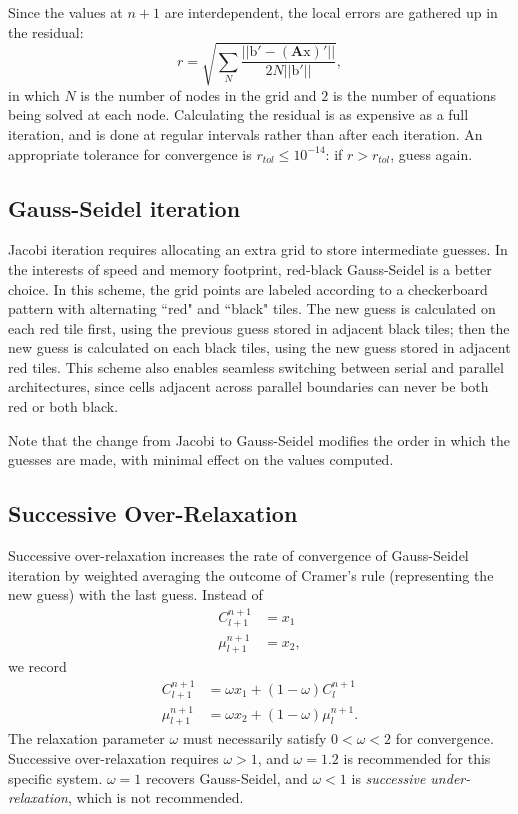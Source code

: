 	Since the values at $n+1$ are interdependent, the local errors are gathered up in the residual:
	\[r = \sqrt{\sum\limits_{N}\frac{||\mathrm{b}' - \left(\mathbf{A}\mathrm{x}\right)'||}{2N||\mathrm{b}'||}},\]
	in which $N$ is the number of nodes in the grid and $2$ is the number of equations being solved at each node.
	Calculating the residual is as expensive as a full iteration, and is done at regular intervals rather than after each iteration.
	An appropriate tolerance for convergence is $r_{tol}\leq10^{-14}$: if $r>r_{tol}$, guess again.

	\subsection{Gauss-Seidel iteration}
	Jacobi iteration requires allocating an extra grid to store intermediate guesses.
	In the interests of speed and memory footprint, red-black Gauss-Seidel is a better choice.
	In this scheme, the grid points are labeled according to a checkerboard pattern with alternating ``red" and ``black" tiles.
	The new guess is calculated on each red tile first, using the previous guess stored in adjacent black tiles;
	then the new guess is calculated on each black tiles, using the new guess stored in adjacent red tiles.
	This scheme also enables seamless switching between serial and parallel architectures, since cells adjacent
	across parallel boundaries can never be both red or both black.
	
	Note that the change from Jacobi to Gauss-Seidel modifies the order in which the guesses are made,
	with minimal effect on the values computed.
	
	\subsection{Successive Over-Relaxation}
	Successive over-relaxation increases the rate of convergence of Gauss-Seidel iteration by weighted averaging
	the outcome of Cramer's rule (representing the new guess) with the last guess.
	Instead of
	\begin{align*}
		C_{l+1}^{n+1} &= x_1\\
		\mu_{l+1}^{n+1} &= x_2,
	\end{align*}
	we record
	\begin{align*}
		C_{l+1}^{n+1} &= \omega x_1 + (1-\omega)C_l^{n+1} \\
		\mu_{l+1}^{n+1} &= \omega x_2 + (1-\omega)\mu_l^{n+1}.
	\end{align*}
	The relaxation parameter $\omega$ must necessarily satisfy $0<\omega<2$ for convergence.
	Successive over-relaxation requires $\omega>1$, and $\omega=1.2$ is recommended for this specific system.
	$\omega=1$ recovers Gauss-Seidel, and $\omega<1$ is \emph{successive under-relaxation}, which is not recommended.

